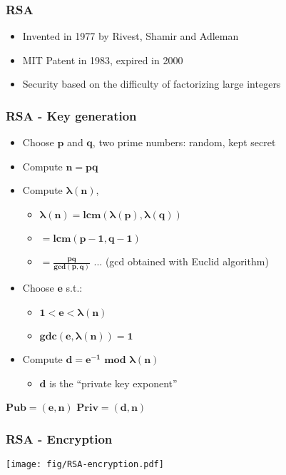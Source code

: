 \documentclass[
hyperref={pdfpagelabels=false}
,xcolor=table
]
{beamer}
\begin{document}
\begin{frame}
  \frametitle{RSA}
  \begin{itemize}
  \item Invented in 1977 by Rivest, Shamir and Adleman
  \item MIT Patent in 1983, expired in 2000
  \item Security based on the difficulty of factorizing large integers
  \end{itemize}
\end{frame}


\begin{frame}
  \frametitle{RSA - Key generation}

  \begin{itemize}
  \item Choose $\bm{p}$ and $\bm{q}$, two prime numbers: random, kept secret
  \item Compute $\bm{n = pq}$
  \item Compute $\bm{\lambda(n)}$,
    \begin{itemize}
    \item $\bm{\lambda(n) = lcm(\lambda(p), \lambda(q))}$
    \item $\bm{= lcm(p-1, q-1)}$
    \item $\bm{= \frac{pq}{gcd(p,q)}}$ ... (gcd obtained with Euclid algorithm)
    \end{itemize}
  \item Choose $\bm{e}$ s.t.:
    \begin{itemize}
    \item $\bm{1 < e < \lambda(n)}$
    \item $\bm{gdc(e,\lambda(n))=1}$
    \end{itemize}
  \item Compute $\bm{d = e^{-1} \mbox{ mod } \lambda(n)}$
    \begin{itemize}
    \item $\bm{d}$ is the ``private key exponent''
    \end{itemize}
  \end{itemize}

  \begin{tcolorbox}[colframe=Myred]
    $\bm{Pub = (e,n)}$ \hfill $\bm{Priv = (d,n)}$
  \end{tcolorbox}  
\end{frame}


\begin{frame}
  \frametitle{RSA - Encryption}

  \begin{center}
    \texttt{[image: fig/RSA-encryption.pdf]}
  \end{center}
  
\end{frame}
\end{document}
